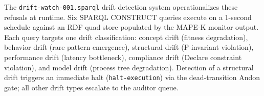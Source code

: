 The \texttt{drift-watch-001.sparql} drift detection system operationalizes these refusals at runtime. Six SPARQL CONSTRUCT queries execute on a 1-second schedule against an RDF quad store populated by the MAPE-K monitor output. Each query targets one drift classification: concept drift (fitness degradation), behavior drift (rare pattern emergence), structural drift (P-invariant violation), performance drift (latency bottleneck), compliance drift (Declare constraint violation), and model drift (process tree degradation). Detection of a structural drift triggers an immediate halt (\texttt{halt-execution}) via the dead-transition Andon gate; all other drift types escalate to the auditor queue.
